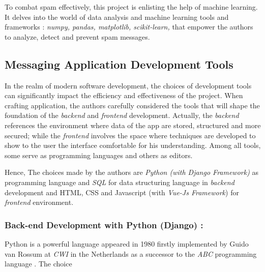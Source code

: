 \documentclass[12pt,a4paper]{report}
\begin{document}
	To combat spam effectively, this project is enlisting the help of machine learning. It delves into the world of data analysis and machine learning tools and frameworks : \textit{numpy, pandas, matplotlib, scikit-learn,} that empower the authors to analyze, detect and prevent spam messages.\\
	
	\subsection{Messaging Application Development Tools}
	In the realm of modern software development, the choices of development tools can significantly impact the efficiency and effectiveness of the project. When crafting application, the authors carefully considered the tools that will shape the foundation of the \textit{backend} and \textit{frontend} development. Actually, the \textit{backend} references the environment where data of the app are stored, structured and more secured; while the \textit{frontend} involves the space where techniques are developed to show to the user the interface comfortable for his understanding. Among all tools, some serve as programming languages and others as editors. 
	
	Hence, The choices made by the authors are \textit{Python (with Django \textit{Framework})} as programming language and \textit{SQL} for data structuring language in \textit{backend} development and HTML, CSS and Javascript (with \textit{Vue-Js Framework}) for \textit{frontend} environment. \\
	
	\subsubsection{Back-end Development with Python (Django) :} 
	 Python is a powerful language appeared in 1980 firstly implemented by Guido van Rossum at \textit{CWI} in the Netherlands as a successor to the \textit{ABC} programming language \cite{tulchak2016history}. The choice 
	 
	
	




  
  
  
  
   
	
	
	
	\newpage	
	
	
	
	
	
	
	
\end{document}
